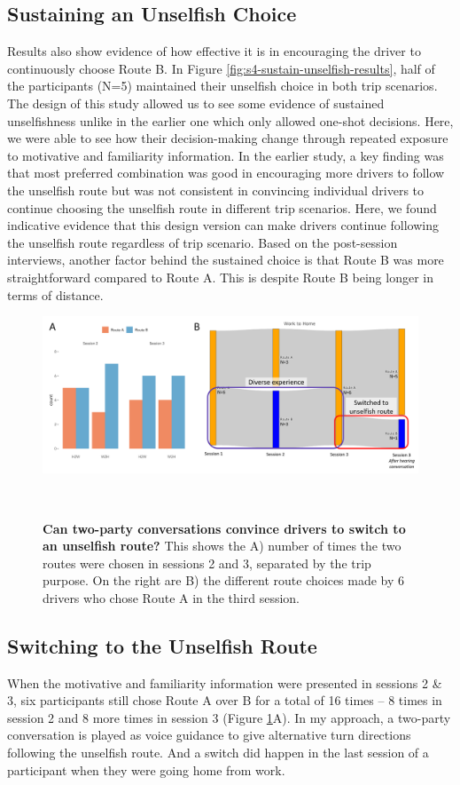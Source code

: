 \subsection{Sustaining an Unselfish Choice}
Results also show evidence of how effective it is in encouraging the driver to continuously choose Route B. In Figure \ref{fig:s4-sustain-unselfish-results}, half of the participants (N=5) maintained their unselfish choice in both trip scenarios. The design of this study allowed us to see some evidence of sustained unselfishness unlike in the earlier one which only allowed one-shot decisions. Here, we were able to see how their decision-making change through repeated exposure to motivative and familiarity information. In the earlier study, a key finding was that most preferred combination was good in encouraging more drivers to follow the unselfish route but was not consistent in convincing individual drivers to continue choosing the unselfish route in different trip scenarios. Here, we found indicative evidence that this design version can make drivers continue following the unselfish route regardless of trip scenario. Based on the post-session interviews, another factor behind the sustained choice is that Route B was more straightforward compared to Route A. This is despite Route B being longer in terms of distance. 

\begin{figure}[h]
\centering
  \includegraphics[scale=.45]{figures/s4-switch-unselfish.png}
  \caption{\textbf{Can two-party conversations convince drivers to switch to an unselfish route?} This shows the A) number of times the two routes were chosen in sessions 2 and 3, separated by the trip purpose. On the right are B) the different route choices made by 6 drivers who chose Route A in the third session.}~\label{fig:s4-switch-unselfish}
\end{figure}

\subsection{Switching to the Unselfish Route}
When the motivative and familiarity information were presented in sessions 2 \& 3, six participants still chose Route A over B for a total of 16 times -- 8 times in session 2 and 8 more times in session 3 (Figure \ref{fig:s4-switch-unselfish}A). In my approach, a two-party conversation is played as voice guidance to give alternative turn directions following the unselfish route. And a switch did happen in the last session of a participant when they were going home from work. 

